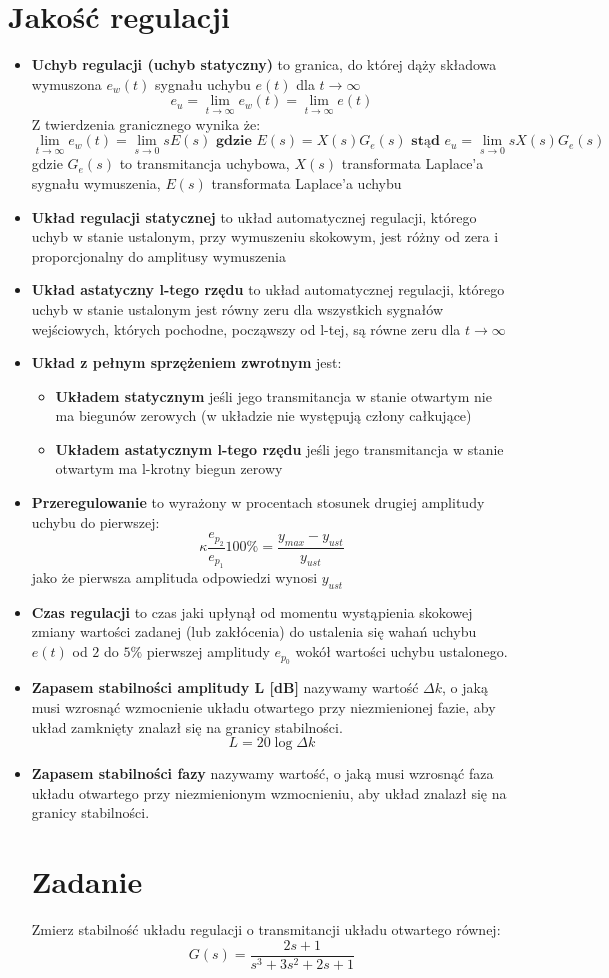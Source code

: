 \documentclass[a4paper]{article}
\begin{document}
\section{Jakość regulacji}
\begin{itemize}
\item \textbf{Uchyb regulacji (uchyb statyczny)} to granica, do której dąży składowa wymuszona $e_w(t)$ sygnału uchybu $e(t)$ dla $ t \rightarrow \infty$
$$ e_u = \lim_{t \rightarrow \infty} e_w(t) = \lim_{t \rightarrow \infty } e(t) $$
Z twierdzenia granicznego wynika że:
$$ \lim_{t \rightarrow \infty} e_w(t) = \lim_{s \rightarrow 0}sE(s) \textbf{  gdzie  } E(s) = X(s)G_e(s) \textbf{  stąd  } e_u = \lim_{s \rightarrow 0}sX(s)G_e(s)$$
gdzie $G_e(s)$ to transmitancja uchybowa, $X(s)$ transformata Laplace'a sygnału wymuszenia, $E(s)$ transformata Laplace'a uchybu
\item \textbf{Układ regulacji statycznej} to układ automatycznej regulacji, którego uchyb w stanie ustalonym, przy wymuszeniu skokowym, jest różny od zera i proporcjonalny do amplitusy wymuszenia
\item \textbf{Układ astatyczny l-tego rzędu} to układ automatycznej regulacji, którego uchyb w stanie ustalonym jest równy zeru dla wszystkich sygnałów wejściowych, których pochodne, począwszy od l-tej, są równe zeru dla $t \rightarrow \infty $
\item \textbf{Układ z pełnym sprzężeniem zwrotnym} jest:
\begin{itemize}
\item \textbf{Układem statycznym} jeśli jego transmitancja w stanie otwartym nie ma biegunów zerowych (w układzie nie występują człony całkujące) 
\item \textbf{Układem astatycznym l-tego rzędu} jeśli jego transmitancja w stanie otwartym ma l-krotny biegun zerowy
\end{itemize}
\pagebreak
\item \textbf{Przeregulowanie} to wyrażony w procentach stosunek drugiej amplitudy uchybu do pierwszej:
$$ \kappa \frac{e_{p_2}}{e_{p_1}}100\% = \frac{y_{max}-y_{ust}}{y_{ust}} $$
jako że pierwsza amplituda odpowiedzi wynosi $y_{ust}$
\item \textbf{Czas regulacji} to czas jaki upłynął od momentu wystąpienia skokowej zmiany wartości zadanej (lub zakłócenia) do ustalenia się wahań uchybu $e(t)$ od $2$ do $5\%$ pierwszej amplitudy $e_{p_0}$ wokół wartości uchybu ustalonego.
\item \textbf{Zapasem stabilności amplitudy L [dB]} nazywamy wartość $\Delta k$, o jaką musi wzrosnąć wzmocnienie układu otwartego przy niezmienionej fazie, aby układ zamknięty znalazł się na granicy stabilności.
$$ L = 20 \log \Delta k$$
\item \textbf{Zapasem stabilności fazy} nazywamy wartość, o jaką musi wzrosnąć faza układu otwartego przy niezmienionym wzmocnieniu, aby układ znalazł się na granicy stabilności.
\section{Zadanie}
Zmierz stabilność układu regulacji o transmitancji układu otwartego równej:
$$ G(s) = \frac{2s+1}{s^3+3s^2+2s+1}$$
\end{itemize}
\fi
\end{document}
